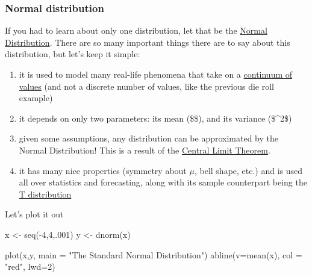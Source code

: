 \documentclass[
  letterpaper,
  DIV=11,
  numbers=noendperiod]{scrartcl}
\newenvironment{Shaded}{\begin{snugshade}}{\end{snugshade}}
\newcommand{\AttributeTok}[1]{\textcolor[rgb]{0.40,0.45,0.13}{#1}}
\newcommand{\DecValTok}[1]{\textcolor[rgb]{0.68,0.00,0.00}{#1}}
\newcommand{\FunctionTok}[1]{\textcolor[rgb]{0.28,0.35,0.67}{#1}}
\newcommand{\NormalTok}[1]{\textcolor[rgb]{0.00,0.23,0.31}{#1}}
\newcommand{\OtherTok}[1]{\textcolor[rgb]{0.00,0.23,0.31}{#1}}
\newcommand{\SpecialCharTok}[1]{\textcolor[rgb]{0.37,0.37,0.37}{#1}}
\newcommand{\StringTok}[1]{\textcolor[rgb]{0.13,0.47,0.30}{#1}}
\providecommand{\tightlist}{%
  \setlength{\itemsep}{0pt}\setlength{\parskip}{0pt}}\usepackage{longtable,booktabs,array}
\begin{document}
\subsubsection{Normal distribution}\label{normal-distribution}

If you had to learn about only one distribution, let that be the
\href{https://www.investopedia.com/terms/n/normaldistribution.asp\#:~:text=The\%20Bottom\%20Line-,Normal\%20distribution\%2C\%20also\%20known\%20as\%20the\%20Gaussian\%20distribution\%2C\%20is\%20a,defined\%20by\%20the\%20standard\%20deviation.}{Normal
Distribution}. There are so many important things there are to say about
this distribution, but let's keep it simple:

\begin{enumerate}
\def\labelenumi{\arabic{enumi}.}
\tightlist
\item
  it is used to model many real-life phenomena that take on a
  \href{https://www.google.com/url?sa=t&source=web&rct=j&opi=89978449&url=https://www.youtube.com/watch\%3Fv\%3DQxqxdQ_g2uw&ved=2ahUKEwithPq87daJAxVr_7sIHWqJG7QQwqsBegQIMRAF&usg=AOvVaw0dJpzZRYGkC9qx1omRy_Xa}{continuum
  of values} (and not a discrete number of values, like the previous die
  roll example)
\item
  it depends on only two parameters: its mean (\$\mu\$), and its
  variance (\$\sigma\^{}2\$)
\item
  given some assumptions, any distribution can be approximated by the
  Normal Distribution! This is a result of the
  \href{https://www.investopedia.com/terms/c/central_limit_theorem.asp}{Central
  Limit Theorem}.
\item
  it has many nice properties (symmetry about \(\mu\), bell shape, etc.)
  and is used all over statistics and forecasting, along with its sample
  counterpart being the
  \href{https://www.investopedia.com/terms/t/tdistribution.asp}{T
  distribution}
\end{enumerate}

Let's plot it out

\begin{Shaded}
\begin{Highlighting}[]
\NormalTok{x }\OtherTok{\textless{}{-}} \FunctionTok{seq}\NormalTok{(}\SpecialCharTok{{-}}\DecValTok{4}\NormalTok{,}\DecValTok{4}\NormalTok{,.}\DecValTok{001}\NormalTok{)}
\NormalTok{y }\OtherTok{\textless{}{-}} \FunctionTok{dnorm}\NormalTok{(x)}

\FunctionTok{plot}\NormalTok{(x,y, }\AttributeTok{main =} \StringTok{"The Standard Normal Distribution"}\NormalTok{)}
\FunctionTok{abline}\NormalTok{(}\AttributeTok{v=}\FunctionTok{mean}\NormalTok{(x), }\AttributeTok{col =} \StringTok{"red"}\NormalTok{, }\AttributeTok{lwd=}\DecValTok{2}\NormalTok{)}
\end{Highlighting}
\end{Shaded}
\end{document}
